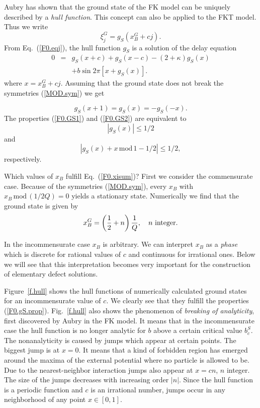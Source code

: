 Aubry has shown\cite{aub.78} that the ground state of the 
FK model can be uniquely described by a {\em hull function\/}. 
This concept can also be applied to the FKT model. Thus we write
\begin{equation}
  \xi_j^G=g_S(x_B^G+cj).
  \label{F0.gS}
\end{equation}
From Eq.~(\ref{F0.eqj}), the hull function $g_S$ is a solution of the
delay equation
\begin{eqnarray}
  0&=&g_S(x+c)+g_S(x-c)-(2+\kappa)g_S(x)\nonumber\\
   &&+b\sin 2\pi[x+g_S(x)]. \label{F0.gS.eq}
\end{eqnarray}
where $x = x_B^G+cj$. Assuming that the ground state does not break
the symmetries (\ref{MOD.sym}) we get 
\begin{mathletters}
\label{F0.gS.prop}
\begin{equation}
  g_S(x+1)=g_S(x)=-g_S(-x).
  \label{F0.gS.sym}
\end{equation}
The properties (\ref{F0.GS1}) and (\ref{F0.GS2}) are equivalent to
\begin{equation}
   |g_S(x)|\le 1/2
  \label{F0.gS.p1}
\end{equation}
and
\begin{equation}
   |g_S(x)+x\,\mbox{mod}\,1-1/2|\le 1/2,
  \label{F0.gS.p2}
\end{equation}
respectively.
\end{mathletters}

Which values of $x_B$ fulfill Eq.~(\ref{F0.xisum})?
First we consider the commensurate case. Because of the symmetries
(\ref{MOD.sym}), every $x_B$ with $x_B\,\mbox{mod}\,(1/2Q)=0$ yields
a stationary state. Numerically we find that the ground state is
given by
\begin{equation}
 x_B^G=\left(\frac{1}{2}+n\right)\frac{1}{Q},\quad n\ {\rm integer}.
   \label{F0.xB}
\end{equation}

In the incommensurate case $x_B$ is arbitrary.  We can interpret
$x_B$ as a {\em phase\/} which is discrete for rational values of $c$
and continuous for irrational ones. Below we will see that this
interpretation becomes very important for the construction of
elementary defect solutions.

Figure~\ref{f.hull} shows the hull functions of numerically
calculated ground states for an incommensurate value of $c$.  We
clearly see that they fulfill the properties (\ref{F0.gS.prop}).
Fig.~\ref{f.hull} also shows the phenomenon of {\em breaking of 
analyticity\/}, first discovered by Aubry\cite{aub.78} in the FK
model. It means that in the incommensurate case the hull function is
no longer analytic for $b$ above a certain critical value $b_c^S$.
The nonanalyticity is caused by jumps which appear at certain points.
The biggest jump is at $x=0$. It means that a kind of forbidden
region has emerged around the maxima of the external potential where
no particle is allowed to be. Due to the nearest-neighbor interaction
jumps also appear at $x=cn$, $n$ integer. The size of the jumps
decreases with increasing order $|n|$. Since the hull function is a
periodic function and $c$ is an irrational number, jumps occur in any
neighborhood of any point $x\in[0,1]$.

